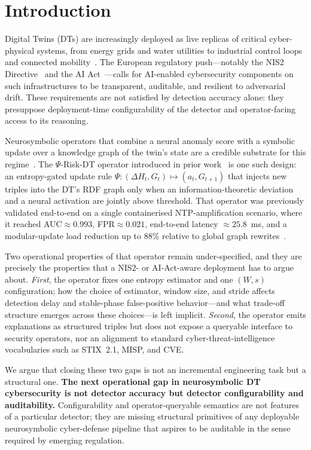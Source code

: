 \documentclass[runningheads]{llncs}
\newcommand{\psiop}{\ensuremath{\Psi}}
\newcommand{\EntropyDeviation}{\ensuremath{\Delta H}}
\begin{document}
\section{Introduction}
\label{sec:intro}

Digital Twins (DTs) are increasingly deployed as live replicas of
critical cyber-physical systems, from energy grids and water utilities
to industrial control loops and connected mobility~\cite{grieves2017,tao2019}.
The European regulatory push---notably the NIS2 Directive~\cite{nis2}
and the AI Act~\cite{aiact}---calls for AI-enabled cybersecurity
components on such infrastructures to be transparent, auditable, and
resilient to adversarial drift. These requirements are not satisfied by
detection accuracy alone: they presuppose deployment-time
configurability of the detector and operator-facing access to its
reasoning.

Neurosymbolic operators that combine a neural anomaly score with a
symbolic update over a knowledge graph of the twin's state are a
credible substrate for this regime~\cite{garcez2023,raedt2020}. The
$\psiop$-Risk-DT operator introduced in prior work~\cite{paper3} is one
such design: an entropy-gated update rule
$\psiop : (\EntropyDeviation_t, G_t) \mapsto (a_t, G_{t+1})$ that injects new triples
into the DT's RDF graph only when an information-theoretic deviation
and a neural activation are jointly above threshold. That operator was
previously validated end-to-end on a single containerised
NTP-amplification scenario, where it reached AUC$\approx 0.993$,
FPR$\approx 0.021$, end-to-end latency $\approx 25.8$~ms, and a
modular-update load reduction up to $88\%$ relative to global graph
rewrites~\cite{paper3}.

Two operational properties of that operator remain under-specified, and
they are precisely the properties that a NIS2- or AI-Act-aware
deployment has to argue about. \emph{First}, the operator fixes one
entropy estimator and one $(W, s)$ configuration; how the choice of
estimator, window size, and stride affects detection delay and
stable-phase false-positive behavior---and what trade-off structure
emerges across these choices---is left implicit. \emph{Second}, the
operator emits explanations as structured triples but does not expose a
queryable interface to security operators, nor an alignment to standard
cyber-threat-intelligence vocabularies such as STIX~2.1, MISP, and CVE.

We argue that closing these two gaps is not an incremental engineering
task but a structural one. \textbf{The next operational gap in
neurosymbolic DT cybersecurity is not detector accuracy but detector
configurability and auditability.} Configurability and operator-queryable
semantics are not features of a particular detector; they are missing
structural primitives of any deployable neurosymbolic cyber-defense
pipeline that aspires to be auditable in the sense required by emerging
regulation.
\end{document}
